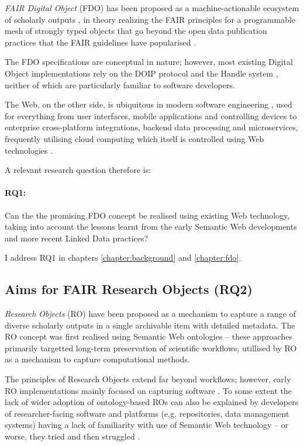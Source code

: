 \emph{FAIR Digital Object} (FDO) has been proposed as a machine-actionable ecosystem of scholarly outputs \cite{Schultes 2019}, in theory realizing the FAIR principles \cite{Wilkinson 2016} for a programmable mesh of strongly typed objects that go beyond the open data publication practices that the FAIR guidelines have popularised \cite{Jacobsen 2020}.

The FDO specifications \cite{Ivonne 2023} are conceptual in nature; however, most existing Digital Object implementations \cite{Kahn 2006} rely on the DOIP protocol \cite{Reilly 2009} and the Handle system \cite{Sun 2003a}, neither of which are particularly familiar to software developers.

The Web, on the other side, is ubiquitous in modern software engineering \cite{Taivalsaari 2021}, used for everything from user interfaces, mobile applications and controlling devices to enterprise cross-platform integrations, backend data processing and microservices, frequently utilising cloud computing which itself is controlled using Web technologies \cite{Marinescu 2023}.

A relevant research question therefore is: 

\paragraph{RQ1:}\label{rq1} 
Can the the promising FDO concept be realised using existing Web technology, taking into account the lessons learnt from the early Semantic Web developments and more recent Linked Data practices?

I address RQ1 in chapters \ref{chapter:background} and \ref{chapter:fdo}.


\subsection{Aims for FAIR Research Objects (RQ2)}
\label{intro:rq2}

\emph{Research Objects} (RO) \cite{Bechhofer 2013} have been proposed as a mechanism to capture a range of diverse scholarly outputs in a single archivable item with detailed metadata. The RO concept was first realised using Semantic Web ontologies \cite{myExperiment 2009,Belhajjame 2015} -- these approaches primarily targetted long-term preservation of scientific workflows, utillised by RO as a mechanism to capture computational methods.

The principles of Research Objects extend far beyond workflows; however, early RO implementations mainly focused on capturing software \cite{Goble 2018}. To some extent the lack of wider adoption of ontology-based ROs can also be explained by developers of researcher-facing software and platforms (e.g. repositories, data management systems) having a lack of familiarity with use of Semantic Web technology -- or worse, they tried and then struggled \cite{Carriero 2010,Tudorache 2020}.

